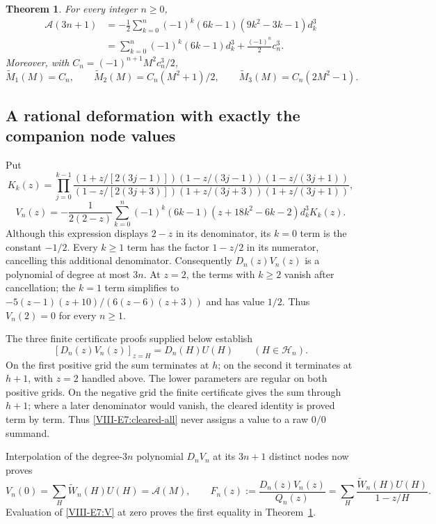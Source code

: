 \documentclass[11pt,letterpaper]{article}
\newtheorem{theorem}{Theorem}[section]
\numberwithin{equation}{section}
\begin{document}
\begin{theorem}\label{VIII-E7:companion-exact}
For every integer $n\ge0$,
\begin{align*}
 \mathcal A(3n+1)
 &=-\frac12\sum_{k=0}^n(-1)^k(6k-1)(9k^2-3k-1)d_k^3\\
 &=\sum_{k=0}^n(-1)^k(6k-1)d_k^3+\frac{(-1)^n}{2}c_n^3.
\end{align*}
Moreover, with $C_n=(-1)^{n+1}M^2c_n^3/2$,
\[
 \widetilde M_1(M)=C_n,\qquad
 \widetilde M_2(M)=C_n(M^2+1)/2,\qquad
 \widetilde M_3(M)=C_n(2M^2-1).
\]
\end{theorem}

\subsection{A rational deformation with exactly the companion node values}
Put
\[
 K_k(z)=\prod_{j=0}^{k-1}
 \frac{(1+z/[2(3j-1)])(1-z/(3j-1))(1-z/(3j+1))}
 {(1-z/[2(3j+3)])(1+z/(3j+3))(1+z/(3j+1))},
\]
\begin{equation}\label{VIII-E7:V}
 V_n(z)=-\frac1{2(2-z)}\sum_{k=0}^n
 (-1)^k(6k-1)(z+18k^2-6k-2)d_k^3K_k(z).
\end{equation}
Although this expression displays $2-z$ in its denominator, its
$k=0$ term is the constant $-1/2$. Every $k\ge1$ term has the
factor $1-z/2$ in its numerator, cancelling this additional denominator.
Consequently $D_n(z)V_n(z)$ is a polynomial of degree at most $3n$.
At $z=2$, the terms with $k\ge2$ vanish after cancellation; the $k=1$
term simplifies to $-5(z-1)(z+10)/(6(z-6)(z+3))$ and has value $1/2$.
Thus $V_n(2)=0$ for every $n\ge1$.

The three finite certificate proofs supplied below establish
\begin{equation}\label{VIII-E7:cleared-all}
 [D_n(z)V_n(z)]_{z=H}=D_n(H)U(H)
 \qquad(H\in\mathcal H_n).
\end{equation}
On the first positive grid the sum terminates at $h$; on the second
it terminates at $h+1$, with $z=2$ handled above. The lower parameters
are regular on both positive grids. On the negative grid the finite
certificate gives the sum through $h+1$; where a later denominator
would vanish, the cleared identity is proved term by term. Thus
\eqref{VIII-E7:cleared-all} never assigns a value to a raw $0/0$ summand.

Interpolation of the degree-$3n$ polynomial $D_nV_n$ at its $3n+1$
distinct nodes now proves
\[
 V_n(0)=\sum_H\widetilde W_n(H)U(H)=\mathcal A(M),\qquad
 F_n(z):=\frac{D_n(z)V_n(z)}{Q_n(z)}
 =\sum_H\frac{\widetilde W_n(H)U(H)}{1-z/H}.
\]
Evaluation of \eqref{VIII-E7:V} at zero proves the first equality in
Theorem~\ref{VIII-E7:companion-exact}.
\end{document}
